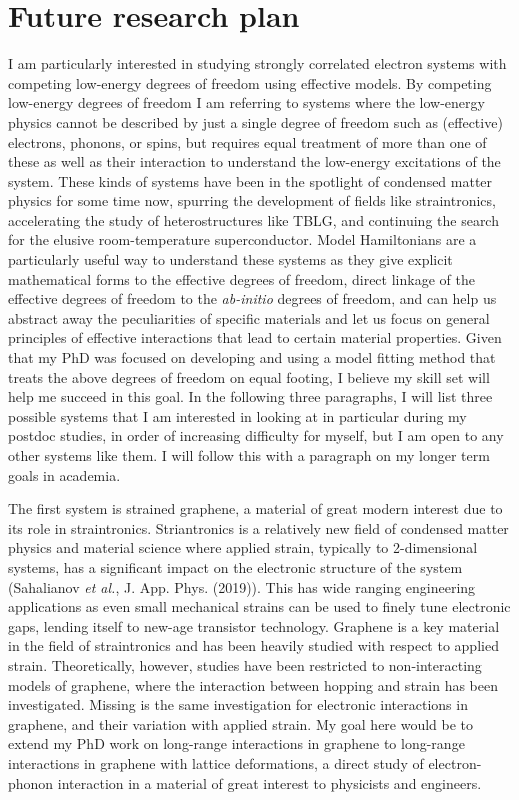 \documentclass{article}
\begin{document}
\section{Future research plan}
I am particularly interested in studying strongly correlated electron systems with competing low-energy degrees of freedom using effective models.
By competing low-energy degrees of freedom I am referring to systems where the low-energy physics cannot be described by just a single degree of freedom such as (effective) electrons, phonons, or spins, but requires equal treatment of more than one of these as well as their interaction to understand the low-energy excitations of the system.
These kinds of systems have been in the spotlight of condensed matter physics for some time now, spurring the development of fields like straintronics, accelerating the study of heterostructures like TBLG, and continuing the search for the elusive room-temperature superconductor.
Model Hamiltonians are a particularly useful way to understand these systems as they give explicit mathematical forms to the effective degrees of freedom, direct linkage of the effective degrees of freedom to the \textit{ab-initio} degrees of freedom, and can help us abstract away the peculiarities of specific materials and let us focus on general principles of effective interactions that lead to certain material properties.
Given that my PhD was focused on developing and using a model fitting method that treats the above degrees of freedom on equal footing, I believe my skill set will help me succeed in this goal.
In the following three paragraphs, I will list three possible systems that I am interested in looking at in particular during my postdoc studies, in order of increasing difficulty for myself, but I am open to any other systems like them.
I will follow this with a paragraph on my longer term goals in academia.

The first system is strained graphene, a material of great modern interest due to its role in straintronics.
Striantronics is a relatively new field of condensed matter physics and material science where applied strain, typically to 2-dimensional systems, has a significant impact on the electronic structure of the system (Sahalianov \textit{et al.}, J. App. Phys. (2019)).
This has wide ranging engineering applications as even small mechanical strains can be used to finely tune electronic gaps, lending itself to new-age transistor technology.
Graphene is a key material in the field of straintronics and has been heavily studied with respect to applied strain.
Theoretically, however, studies have been restricted to non-interacting models of graphene, where the interaction between hopping and strain has been investigated.
Missing is the same investigation for electronic interactions in graphene,  and their variation with applied strain. 
My goal here would be to extend my PhD work on long-range interactions in graphene to long-range interactions in graphene with lattice deformations, a direct study of electron-phonon interaction in a material of great interest to physicists and engineers.
\end{document}
